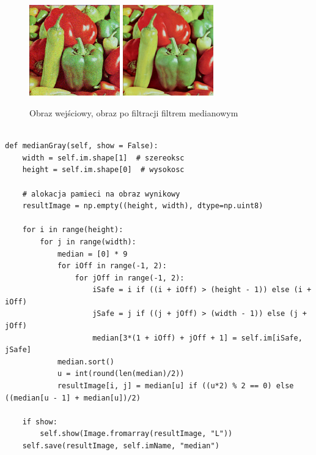 \documentclass[final,a4paper,openany,12pt]{mwbk}
\begin{document}
\begin{figure}[H]
	\begin{center}
		\includegraphics[width=0.35\textwidth]{peppers_color_noise}
		\includegraphics[width=0.35\textwidth]{peppers_color_noise_median_result}
	\end{center}
	\caption{Obraz wejściowy, obraz po filtracji filtrem medianowym}
\end{figure}

\newpage


\begin{lstlisting}[caption=Filtr medianowy (obraz szary)]
	
def medianGray(self, show = False):
	width = self.im.shape[1]  # szereoksc
	height = self.im.shape[0]  # wysokosc
	
	# alokacja pamieci na obraz wynikowy
	resultImage = np.empty((height, width), dtype=np.uint8)
	
	for i in range(height):
		for j in range(width):
			median = [0] * 9
			for iOff in range(-1, 2):
				for jOff in range(-1, 2):
					iSafe = i if ((i + iOff) > (height - 1)) else (i + iOff)
					jSafe = j if ((j + jOff) > (width - 1)) else (j + jOff)
					median[3*(1 + iOff) + jOff + 1] = self.im[iSafe, jSafe]
			median.sort()
			u = int(round(len(median)/2))
			resultImage[i, j] = median[u] if ((u*2) % 2 == 0) else ((median[u - 1] + median[u])/2)
	
	if show:
		self.show(Image.fromarray(resultImage, "L"))
	self.save(resultImage, self.imName, "median")
	
\end{lstlisting}
\end{document}
